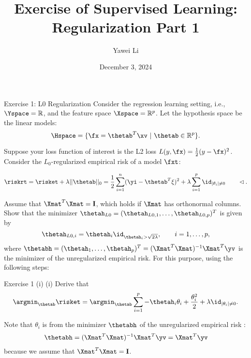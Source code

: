 \documentclass[aspectratio=169]{beamer}
\title[]{\textbf{Exercise of Supervised Learning: \\ Regularization Part 1}}
\author{Yawei Li}
\institute[LMU]
{
\\
  \texttt{yawei.li@stat.uni-muenchen.de}
}
\date{December 3, 2024}
\newcommand{\thetahi}{\thetah_i}
\newcommand{\thetai}{\theta_i}
\newcommand{\thetainnz}{\id_{|\theta_i| \neq 0}}
\newcommand{\Imat}{\mathbf{I}}
\newcommand{\sumip}{\sum_{i=1}^p}
\begin{document}
\begin{frame}
\titlepage

\end{frame}



\begin{frame}{Exercise 1: L0 Regularization}
	\small
	Consider the regression learning setting, i.e., $\Yspace = \mathbb{R}$, and the feature space $\Xspace = \mathbb{R}^p$. Let the hypothesis space be the linear models: $$\Hspace = \{ \fx = \thetab^T \xv \ | \ \thetab \in \mathbb{R}^p \}.$$
	
	Suppose your loss function of interest is the L2 loss $L(y, \fx) = \frac{1}{2} (y - \fx)^2$. Consider the $L_0$-regularized empirical risk of a model $\fxt$: 
	
	$$
		\riskrt = \risket + \lambda ||\thetab ||_0 = \frac{1}{2} \sum_{i=1}^n (\yi - \thetab^T \xi )^2 + \lambda \sum_{i=1}^p \thetainnz \qquad \lhd.
	$$
	
	Assume that $\Xmat^T \Xmat = \Imat$, which holds if $\Xmat$ has orthonormal columns. Show that the minimizer $\thetah_{L0} = (\thetah_{L0, 1}, \ldots, \thetah_{L0, p})^T$ is given by 
	$$
		\thetah_{L0, i} = \thetahi \id_{\thetahi > \sqrt{2 \lambda}}, \qquad i = 1, \ldots, p,
	$$
	where $\thetabh = (\thetah_1, \ldots, \thetah_p)^T = (\Xmat^T \Xmat)^{-1} \Xmat^T \yv$ is the minimizer of the unregularized empirical risk. For this purpose, using the following steps:
	
\end{frame}

\begin{frame}{Exercise 1 (i)}
	(i) Derive that 
	\begin{align*}
		\argmin_{\thetab} \risket = \argmin_{\thetab} \sumip - \thetahi \thetai + \frac{\thetai^2}{2} + \lambda \thetainnz.
	\end{align*}
	
	Note that $\thetai$ is from the minimizer $\thetabh$ of the unregularized empirical risk :
	\begin{align*}
		\thetabh = (\Xmat^T \Xmat)^{-1} \Xmat^T \yv = \Xmat^T \yv
	\end{align*}
	because we assume that $\Xmat^T \Xmat = \Imat$.
\end{frame}
\end{document}
